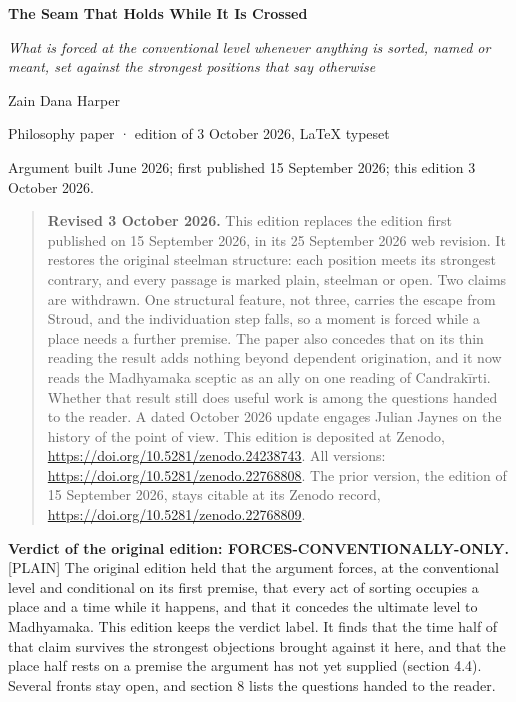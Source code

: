 \documentclass[11pt]{article}
\newcommand{\register}[1]{{\ttfamily\small #1}}
\begin{document}
\begin{center}
{\LARGE\bfseries The Seam That Holds While It Is Crossed\par}
\medskip
{\large\emph{What is forced at the conventional level whenever anything is sorted, named or meant, set against the strongest positions that say otherwise}\par}
\medskip
Zain Dana Harper\par
{\small Philosophy paper · edition of 3 October 2026, LaTeX typeset\par}
{\small Argument built June 2026; first published 15 September 2026; this edition 3 October 2026.\par}
\end{center}

\begin{quote}\small
\textbf{Revised 3 October 2026.} This edition replaces the edition first published on 15 September 2026, in its 25 September 2026 web revision. It restores the original steelman structure: each position meets its strongest contrary, and every passage is marked plain, steelman or open. Two claims are withdrawn. One structural feature, not three, carries the escape from Stroud, and the individuation step falls, so a moment is forced while a place needs a further premise. The paper also concedes that on its thin reading the result adds nothing beyond dependent origination, and it now reads the Madhyamaka sceptic as an ally on one reading of Candrakīrti. Whether that result still does useful work is among the questions handed to the reader. A dated October 2026 update engages Julian Jaynes on the history of the point of view. This edition is deposited at Zenodo, \url{https://doi.org/10.5281/zenodo.24238743}. All versions: \url{https://doi.org/10.5281/zenodo.22768808}. The prior version, the edition of 15 September 2026, stays citable at its Zenodo record, \url{https://doi.org/10.5281/zenodo.22768809}.
\end{quote}
\textbf{Verdict of the original edition: FORCES-CONVENTIONALLY-ONLY.} \register{[PLAIN]} The original edition held that the argument forces, at the conventional level and conditional on its first premise, that every act of sorting occupies a place and a time while it happens, and that it concedes the ultimate level to Madhyamaka. This edition keeps the verdict label. It finds that the time half of that claim survives the strongest objections brought against it here, and that the place half rests on a premise the argument has not yet supplied (section 4.4). Several fronts stay open, and section 8 lists the questions handed to the reader.
\end{document}
